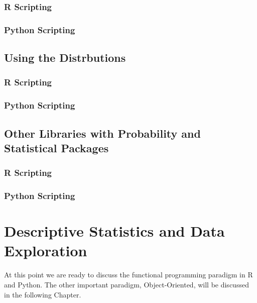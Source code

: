\documentclass[]{book}
\theoremstyle{definition}
\theoremstyle{definition}
\theoremstyle{definition}
\theoremstyle{remark}
\begin{document}
\subsection{R Scripting}\label{r-scripting-5}

\subsection{Python Scripting}\label{python-scripting-5}

\section{Using the Distrbutions}\label{using-the-distrbutions}

\subsection{R Scripting}\label{r-scripting-6}

\subsection{Python Scripting}\label{python-scripting-6}

\section{Other Libraries with Probability and Statistical
Packages}\label{other-libraries-with-probability-and-statistical-packages}

\subsection{R Scripting}\label{r-scripting-7}

\subsection{Python Scripting}\label{python-scripting-7}

\chapter{Descriptive Statistics and Data
Exploration}\label{descriptive-statistics-and-data-exploration}

At this point we are ready to discuss the functional programming
paradigm in R and Python. The other important paradigm, Object-Oriented,
will be discussed in the following Chapter.
\end{document}
